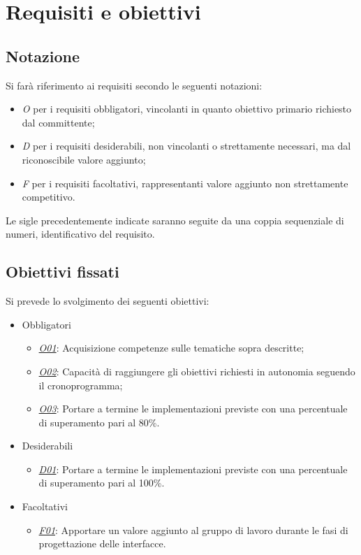 
\section{Requisiti e obiettivi}
\subsection*{Notazione}
Si farà riferimento ai requisiti secondo le seguenti notazioni:
\begin{itemize}
	\item \textit{O} per i requisiti obbligatori, vincolanti in quanto obiettivo primario richiesto dal committente;
	\item \textit{D} per i requisiti desiderabili, non vincolanti o strettamente necessari,
		  ma dal riconoscibile valore aggiunto;
	\item \textit{F} per i requisiti facoltativi, rappresentanti valore aggiunto non strettamente 
		  competitivo.
\end{itemize}

Le sigle precedentemente indicate saranno seguite da una coppia sequenziale di numeri, identificativo del requisito.

\subsection*{Obiettivi fissati}
Si prevede lo svolgimento dei seguenti obiettivi:
\begin{itemize}
	\item Obbligatori
	\begin{itemize}
		\item \underline{\textit{O01}}: Acquisizione competenze sulle tematiche sopra descritte;
    	\item \underline{\textit{O02}}: Capacità di raggiungere gli obiettivi richiesti in autonomia seguendo il cronoprogramma;
    	\item \underline{\textit{O03}}: Portare a termine le implementazioni previste con una percentuale di superamento pari al
         80\%.
	\end{itemize}
	
	\item Desiderabili 
	\begin{itemize}
		\item \underline{\textit{D01}}: Portare a termine le implementazioni previste con una percentuale di superamento pari al 100\%.
	\end{itemize}
	
	\item Facoltativi
	\begin{itemize}
		\item \underline{\textit{F01}}: Apportare un valore aggiunto al gruppo di lavoro durante le fasi di progettazione delle interfacce.
	\end{itemize} 
\end{itemize}

